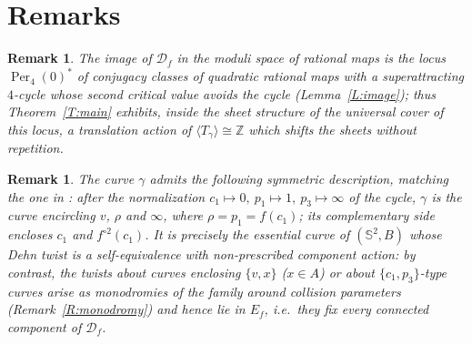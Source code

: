 \documentclass[11pt]{amsart}
\newtheorem{remark}[theorem]{Remark}
\newcommand{\Sph}{\mathbb{S}^{2}}
\newcommand{\Def}{\mathcal{D}}
\begin{document}
\section{Remarks}

\begin{remark}
The image of $\Def_f$ in the moduli space of rational maps is the locus
$\operatorname{Per}_4(0)^*$ of conjugacy classes of quadratic rational maps
with a superattracting $4$-cycle whose second critical value avoids the
cycle (Lemma~\ref{L:image}); thus Theorem~\ref{T:main} exhibits, inside the
sheet structure of the universal cover of this locus, a translation action
of $\langle T_\gamma\rangle\cong\mathbb{Z}$ which shifts the sheets
without repetition.
\end{remark}

\begin{remark}
The curve $\gamma$ admits the following symmetric description, matching the
one in \cite{Firsova}: after the normalization $c_1\mapsto0,\
p_1\mapsto1,\ p_3\mapsto\infty$ of the cycle, $\gamma$ is the curve
encircling $v$, $\rho$ and $\infty$, where $\rho=p_1=f(c_1)$; its
complementary side encloses $c_1$ and $f^{\circ 2}(c_1)$. It is precisely
the essential curve of $(\Sph,B)$ whose Dehn twist is a self-equivalence
with non-prescribed component action: by contrast, the twists about curves
enclosing $\{v,x\}$ ($x\in A$) or about $\{c_1,p_3\}$-type curves arise as
monodromies of the family around collision parameters
(Remark~\ref{R:monodromy}) and hence lie in $E_f$, i.e.\ they fix every
connected component of $\Def_f$.
\end{remark}
\end{document}

